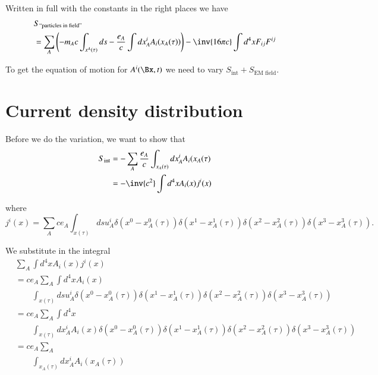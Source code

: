 Written in full with the constants in the right places we have
%
\begin{equation}\label{eqn:relativisticElectrodynamicsL12b:370}
\begin{aligned}
&S_{\text{``particles in field''}} \\
&= \sum_A \left( -m_A c \int_{x^A(\tau)} ds - \frac{e_A}{c} \int dx^i_A A_i(x_A(\tau))
\right)
- \inv{16 \pi c} \int d^4 x F_{ij} F^{ij}
\end{aligned}
\end{equation}

To get the equation of motion for \(A^i(\Bx, t)\) we need to vary \(S_{\text{int}} + S_{\text{EM field}}\).
%
\section{Current density distribution}

Before we do the variation, we want to show that
%
\begin{equation}\label{eqn:relativisticElectrodynamicsL12b:590}
\begin{aligned}
S_{\text{int}}
&= -\sum_A \frac{e_A}{c} \int_{x_A(\tau)} dx^i_A A_i(x_A(\tau) \\
&= -\inv{c^2} \int d^4 x A_i(x) j^i(x)
\end{aligned}
\end{equation}

where
%
\begin{equation}\label{eqn:relativisticElectrodynamicsL12b:390}
j^i(x) =
\sum_A c e_A \int_{x(\tau)}
ds u^i_A
\delta(x^0 - x^0_A(\tau))
\delta(x^1 - x^1_A(\tau))
\delta(x^2 - x^2_A(\tau))
\delta(x^3 - x^3_A(\tau)).
\end{equation}

We substitute in the integral
%
\begin{equation}\label{eqn:relativisticElectrodynamicsL12b:610}
\begin{aligned}
&\sum_A \int d^4 x A_i(x) j^i(x) \\
&=
c e_A \sum_A \int d^4 x A_i(x) \\
&\qquad \int_{x(\tau)}
ds u^i_A
\delta(x^0 - x^0_A(\tau))
\delta(x^1 - x^1_A(\tau))
\delta(x^2 - x^2_A(\tau))
\delta(x^3 - x^3_A(\tau)) \\
&=
c e_A \sum_A
\int d^4 x \\
&\qquad \int_{x(\tau)}
dx^i_A
A_i(x)
\delta(x^0 - x^0_A(\tau))
\delta(x^1 - x^1_A(\tau))
\delta(x^2 - x^2_A(\tau))
\delta(x^3 - x^3_A(\tau)) \\
&=
c e_A \sum_A \\
&\qquad \int_{x_A(\tau)}
dx^i_A
A_i(x_A(\tau))
\end{aligned}
\end{equation}

